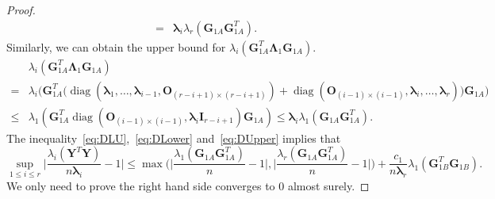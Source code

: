\documentclass[12pt]{article} %
\DeclareMathOperator{\mydiag}{diag}
\newcommand{\bY}{\mathbf{Y}}
\newcommand{\bG}{\mathbf{G}}
\newcommand{\bO}{\mathbf{O}}
\newcommand{\bI}{\mathbf{I}}
\newcommand{\bfsym}[1]{\ensuremath{\boldsymbol{#1}}}
\def\blambda {\bfsym {\lambda}}
\def\bLambda {\bfsym {\Lambda}}
\theoremstyle{definition}
\begin{document}
\begin{appendices}
\begin{proof}
\begin{equation}
\begin{aligned}
= &
\blambda_i \lambda_r(\bG_{1A}\bG_{1A}^T).
\end{aligned}
\end{equation}
Similarly, we can obtain the upper bound for
$\lambda_i(\bG_{1A}^T \bLambda_1 \bG_{1A})$.
\begin{equation}\label{eq:DUpper}
\begin{aligned}
&\lambda_i(\bG_{1A}^T \bLambda_1 \bG_{1A})
\\
=&\lambda_i\Big(
\bG_{1A}^T \big(
\mydiag(\blambda_1,\ldots,\blambda_{i-1},\bO_{(r-i+1)\times(r-i+1)})+
\mydiag(\bO_{(i-1)\times(i-1)},\blambda_i,\ldots,\blambda_r)
\big)
\bG_{1A}
\Big)\\
    \leq&
\lambda_1(\bG_{1A}^T \mydiag(\bO_{(i-1)\times(i-1)},\blambda_i \bI_{r-i+1}) \bG_{1A})
\leq  \blambda_i \lambda_1(\bG_{1A}\bG_{1A}^T).
\end{aligned}
\end{equation}
    The inequality~\eqref{eq:DLU},~\eqref{eq:DLower} and~\eqref{eq:DUpper} implies that
\begin{equation}\label{mainInequality}
\sup_{1\leq i \leq r} \Big|\frac{\lambda_i(\bY^T \bY)}{n\blambda_i}-1\Big|\leq
\max\Big(\Big|\frac{\lambda_1(\bG_{1A}\bG_{1A}^T)}{n}-1\Big|,\Big|\frac{\lambda_r(\bG_{1A}\bG_{1A}^T)}{n}-1\Big|\Big)+\frac{c_1}{n\blambda_r}\lambda_1(\bG_{1B}^T \bG_{1B}).
\end{equation}
    We only need to prove the right hand side converges to $0$ almost surely.


\end{proof}
\end{appendices}
\end{document}
